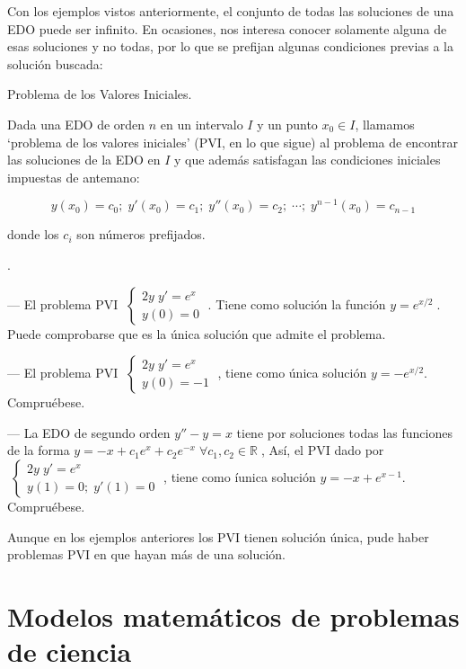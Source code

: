Con los ejemplos vistos anteriormente, el conjunto de todas las soluciones de una EDO puede ser infinito. En ocasiones, nos interesa conocer solamente alguna de esas soluciones y no todas, por lo que se prefijan algunas condiciones previas a la solución buscada:

\begin{defi}{Problema de los Valores Iniciales.}

Dada una EDO de orden $n$ en un intervalo $I$ y un punto $x_0\in I$, llamamos `problema de los valores iniciales' (PVI, en lo que sigue) al problema de encontrar las soluciones de la EDO en $I$ y que además satisfagan las condiciones iniciales impuestas de antemano:

\begin{equation*}
	y(x_0)=c_0; \; y'(x_0)=c_1; \; y''(x_0)=c_2; \; \cdots ; \; y^{n-1}(x_0)=c_{n-1}
\end{equation*}

donde los $c_i$ son números prefijados.
\end{defi}

\begin{ejem}.

--- El problema PVI $\; \begin{cases} 2y\; y'=e^x \\ y(0)=0 \end{cases}\; $. Tiene como solución la función $y=e^{x/2}\; $. Puede comprobarse que es la única solución que admite el problema.

--- El problema PVI $\; \begin{cases} 2y\; y'=e^x \\ y(0)=-1 \end{cases}\; $, tiene como única solución $y=-e^{x/2}$. Compruébese.

--- La EDO de segundo orden $y''-y=x$ tiene por soluciones todas las funciones de la forma $y=-x+c_1 e^x+c_2 e^{-x} \; \forall c_1, c_2 \in \mathbb R \; $, Así, el PVI dado por $\; \begin{cases} 2y \; y'=e^x \\ y(1)=0; \; y'(1)=0 \end{cases}\; $, tiene como íunica solución $y=-x+e^{x-1}$. Compruébese.

Aunque en los ejemplos anteriores los PVI tienen solución única, pude haber problemas PVI en que hayan más de una solución.
\end{ejem}

\section{Modelos matemáticos de problemas de ciencia}


